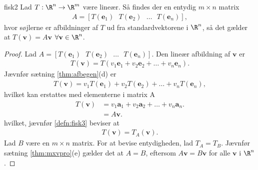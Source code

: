 %
% 
\begin{thm}{}{fisk2}
Lad $T: \R^n \rightarrow \R^m$ være lineær. 
Så findes der en entydig $m \times n$ matrix
\begin{align*}
A= [T(\mathbf{e}_1)\text{    } T(\mathbf{e}_2) \text{    } \ldots \text{    } T(\mathbf{e}_n)],
\end{align*}
hvor søjlerne er afbildninger af $T$ ud fra standardvektorene i $\R^n$, så det gælder at $T(\mathbf{v})=A \mathbf{v}$  $\forall \mathbf{v} \in \R^n$.
\end{thm}
%
%
\begin{proof}
Lad $A= [T(\mathbf{e}_1)\text{    } T(\mathbf{e}_2) \text{    } \ldots \text{    } T(\mathbf{e}_n)]$. 
Den lineær afbildning af $\mathbf{v}$ er
%
\begin{align*}
T(\mathbf{v})= T(v_1 \mathbf{e}_1+v_2 \mathbf{e}_2+ \ldots + v_n \mathbf{e}_n).
\end{align*}
%
Jævnfør sætning \ref{thm:afbegen}(d) er
%
\begin{align*}
T(\mathbf{v})= v_1 T( \mathbf{e}_1)+ v_2 T( \mathbf{e}_2) + \ldots + v_n T( \mathbf{e}_n),
\end{align*}
%
hvilket kan erstattes med elementerne i matrix A
%
\begin{align*}
T(\mathbf{v})&= v_1 \mathbf{a}_1+ v_2 \mathbf{a}_2 + \ldots + v_n \mathbf{a}_n. \\
&= A \mathbf{v}.
\end{align*}
%
hvilket, jævnfør \ref{defn:fisk3} beviser at
%
\begin{align*}
T(\mathbf{v})= T_A (\mathbf{v}).
\end{align*}
%
Lad $B$ være en $m \times n$ matrix. 
For at bevise entydigheden, lad $T_A=T_B$. 
Jævnfør sætning \ref{thm:mxvpro}(e) gælder det at $A=B$, eftersom $A \mathbf{v}=B \mathbf{v}$ for alle $\mathbf{v}$ i $\R^n$.
\end{proof}
%
